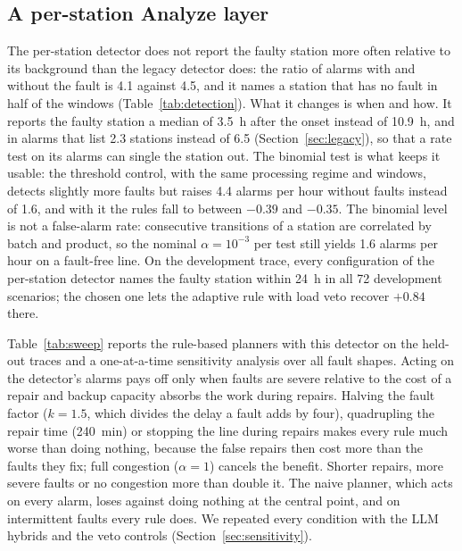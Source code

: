 \documentclass[preprint,11pt]{elsarticle}
\begin{document}
\subsection{A per-station Analyze layer}
\label{sec:sweep}
The per-station detector does not report the faulty station more often relative to its background than the legacy detector does: the ratio of alarms with and without the fault is 4.1 against 4.5, and it names a station that has no fault in half of the windows (Table~\ref{tab:detection}). What it changes is when and how. It reports the faulty station a median of 3.5~h after the onset instead of 10.9~h, and in alarms that list 2.3 stations instead of 6.5 (Section~\ref{sec:legacy}), so that a rate test on its alarms can single the station out. The binomial test is what keeps it usable: the threshold control, with the same processing regime and windows, detects slightly more faults but raises 4.4 alarms per hour without faults instead of 1.6, and with it the rules fall to between $-0.39$ and $-0.35$. The binomial level is not a false-alarm rate: consecutive transitions of a station are correlated by batch and product, so the nominal $\alpha=10^{-3}$ per test still yields 1.6 alarms per hour on a fault-free line. On the development trace, every configuration of the per-station detector names the faulty station within 24~h in all 72 development scenarios; the chosen one lets the adaptive rule with load veto recover $+0.84$ there.

Table~\ref{tab:sweep} reports the rule-based planners with this detector on the held-out traces and a one-at-a-time sensitivity analysis over all fault shapes. Acting on the detector's alarms pays off only when faults are severe relative to the cost of a repair and backup capacity absorbs the work during repairs. Halving the fault factor ($k=1.5$, which divides the delay a fault adds by four), quadrupling the repair time (240~min) or stopping the line during repairs makes every rule much worse than doing nothing, because the false repairs then cost more than the faults they fix; full congestion ($\alpha=1$) cancels the benefit. Shorter repairs, more severe faults or no congestion more than double it. The naive planner, which acts on every alarm, loses against doing nothing at the central point, and on intermittent faults every rule does. We repeated every condition with the LLM hybrids and the veto controls (Section~\ref{sec:sensitivity}).
\end{document}
